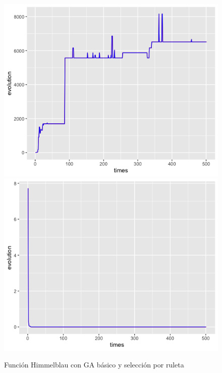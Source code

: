 \documentclass[letterpaper,12pt]{article}
\theoremstyle{definition}
\begin{document}
\begin{figure}[H]
    \includegraphics[width=\linewidth]{himm_basic_fitness}
  \endminipage\hfill
    \includegraphics[width=\linewidth]{himm_basic_eval}
  \endminipage\hfill
  \caption{Función Himmelblau con GA básico y selección por ruleta}
  \label{fig:him_basic}
\end{figure}
\end{document}
